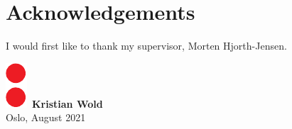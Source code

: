\chapter*{Acknowledgements}
\thispagestyle{plain}

I would first like to thank my supervisor, Morten Hjorth-Jensen.
\\ [8 pt]

\begin{flushright}
\includegraphics[height = 1.5ex]{latex/latex-report/3_Images/Logo/UiO/uio-colon.pdf}\, \textbf{Kristian Wold}
\\
Oslo, August 2021
\end{flushright}
